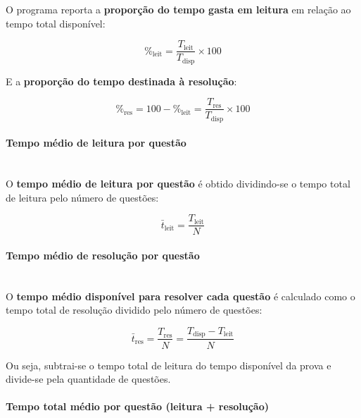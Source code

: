 \documentclass[a4paper,10pt, twocolumn]{article}
\begin{document}
O programa reporta a \textbf{proporção do tempo gasta em leitura} em relação ao tempo total disponível:

\begin{equation}
\%_{\text{leit}} = \frac{T_{\text{leit}}}{T_{\text{disp}}} \times 100
\label{eq:pct_leitura}
\end{equation}

E a \textbf{proporção do tempo destinada à resolução}:

\begin{equation}
\%_{\text{res}} = 100 - \%_{\text{leit}} = \frac{T_{\text{res}}}{T_{\text{disp}}} \times 100
\label{eq:pct_resolucao}
\end{equation}

\paragraph{Tempo médio de leitura por questão}
\mbox{}\\

O \textbf{tempo médio de leitura por questão} é obtido dividindo-se o tempo total de leitura pelo número de questões:

\begin{equation}
\bar{t}_{\text{leit}} = \frac{T_{\text{leit}}}{N}
\label{eq:leitura_media_questao}
\end{equation}

\paragraph{Tempo médio de resolução por questão}
\mbox{}\\

O \textbf{tempo médio disponível para resolver cada questão} é calculado como o tempo total de resolução dividido pelo número de questões:

\begin{equation}
\bar{t}_{\text{res}} = \frac{T_{\text{res}}}{N} = \frac{T_{\text{disp}} - T_{\text{leit}}}{N}
\label{eq:resolucao_media_questao}
\end{equation}

Ou seja, subtrai-se o tempo total de leitura do tempo disponível da prova e divide-se pela quantidade de questões.

\paragraph{Tempo total médio por questão (leitura + resolução)}
\mbox{}\\
\end{document}

